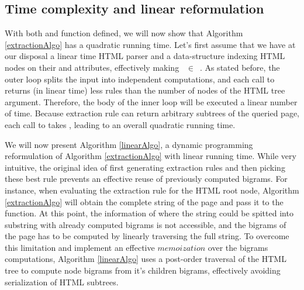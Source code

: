 \similarityAlgo


\subsection{Time complexity and linear reformulation}

With both  and  function defined, we will now show that Algorithm \ref{extractionAlgo} has a quadratic running time. Let's first assume that we have at our disposal a linear time HTML parser and a data-structure indexing HTML nodes on their  and  attributes, effectively making ~$\in$~. As stated before, the outer loop splits the input into independent computations, and each call to  returns (in linear time) less rules than the number of nodes of the HTML tree argument. Therefore, the body of the inner loop will be executed a linear number of time. Because extraction rule can return arbitrary subtrees of the queried page, each call to  takes , leading to an overall quadratic running time.

\linearAlgo

We will now present Algorithm \ref{linearAlgo}, a dynamic programming reformulation of Algorithm \ref{extractionAlgo} with linear running time. While very intuitive, the original idea of first generating extraction rules and then picking these best rule prevents an effective reuse of previously computed bigrams. For instance, when evaluating the extraction rule for the HTML root node, Algorithm \ref{extractionAlgo} will obtain the complete string of the page and pass it to the  function. At this point, the information of where the string could be spitted into substring with already computed bigrams is not accessible, and the bigrams of the page has to be computed by linearly traversing the full string. To overcome this limitation and implement an effective $memoization$ over the bigrams computations, Algorithm \ref{linearAlgo} uses a post-order traversal of the HTML tree to compute node bigrams from it's children bigrams, effectively avoiding serialization of HTML subtrees.



